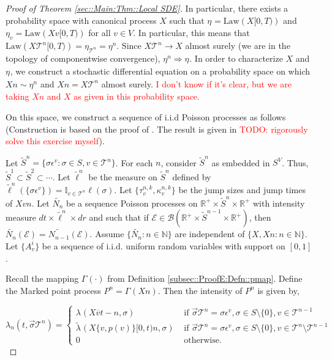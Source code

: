 \documentclass[12pt]{article}
\newcommand{\mb}{\mathbb}
\newcommand{\mc}{\mathcal}
\newcommand{\ms}{\mathscr}
\newcommand{\ra}{\rightarrow}
\newcommand{\ov}{\overline}
\newcommand{\te}{\text}
\newcommand{\ep}{\epsilon}
\newcommand{\tr}{\textcolor{red}}
\newcommand{\ind}{\hspace{24pt}}
\renewcommand{\v}{v}							%
\renewcommand{\S}{S}							%
\newcommand{\s}{\sigma}							%
\newcommand{\sv}{\vec{\s}}						%
\newcommand{\ev}[1]{\ep^{#1}}					%
\newcommand{\T}{T}								%
\renewcommand{\t}{t}							%
\newcommand{\X}{X}								%
\newcommand{\cl}{\ov}							%
\newcommand{\poiss}[1]{N_{#1}}						%
\newcommand{\law}{\te{Law}}							%
\newcommand{\pup}[1]{^{#1}}							%
\newcommand{\tree}{\mc{T}}							%
\newcommand{\V}{V}									%
\renewcommand{\r}{r}								%
\newcommand{\rt}[1]{\tau^{#1}}						%
\renewcommand{\it}{k}								%
\newcommand{\itt}{i}								%
\newcommand{\numb}{n}								%
\newcommand{\XState}[1]{\S^{#1}}				%
\newcommand{\rp}[1]{P^{#1}}							%
\newcommand{\mmm}[3]{\eta_{#2#1}^{#3}}						%
\newcommand{\rate}[1]{\lambda_{#1}}					%
\newcommand{\crate}[2]{\alt{\lambda}_{#1}^{#2}}		%
\newcommand{\Sm}{\ell}								%
\newcommand{\alt}{\widetilde}						%
\newcommand{\rv}{A}								%
\newcommand{\evnt}{\mc{E}}						%
\renewcommand{\mark}[1]{\kappa^{#1}}				%
\newcommand{\p}[1]{p(#1)}						%
\newcommand{\pmap}[1]{\Gamma_{#1}}				%
\begin{document}
\begin{proof}[Proof of Theorem \ref{sec::Main:Thm::Local SDE}]
\ind In particular, there exists a probability space with canonical process \(\X{}{}\) such that \(\mmm{}{}{} = \law(\X{}{[0,\T)})\) and \(\mmm{\v}{}{} = \law(\X{\v}{[0,\T)})\) for all \(\v \in \V\). In particular, this means that \(\law(\X{\tree\pup{\numb}}{[0,\T)}) = \mmm{\tree\pup{\numb}}{}{} = \mmm{}{}{\numb}\). Since \(\X{\tree\pup{\numb}}{} \ra \X{}{}\) almost surely (we are in the topology of componentwise convergence), \(\mmm{}{}{\numb} \Rightarrow \mmm{}{}{}\). In order to characterize \(\X{}{}\) and \(\mmm{}{}{}\), we construct a stochastic differential equation on a probability space on which \(\X{}{}{\numb} \sim \mmm{}{}{\numb}\) and \(\X{}{}{\numb} = \X{\tree\pup{\numb}}{}\) almost surely. \tr{I don't know if it's clear, but we are taking \(\X{}{}{\numb}\) and \(\X{}{}\) as given in this probability space.}

\ind On this space, we construct a sequence of i.i.d Poisson processes as follows (Construction is based on the proof of \cite[Theorem 14.7.1(b)]{DalVer08}. The result is given in \cite[Exercise 14.7.1]{DalVer08} \tr{TODO: rigorously solve this exercise myself}).

\ind Let \(\alt{\S}^\numb = \{\s\ev{\v}: \s\in\S,\v \in \tree\pup{\numb}\}\). For each \(\numb\), consider \(\alt{\S}^\numb\) as embedded in \(\S^\V\). Thus, \(\alt{\S}^1 \subset \alt{\S}^2 \subset \cdots\). Let \(\alt{\Sm}\pup{\numb}\) be the measure on \(\alt{\S}^\numb\) defined by \(\alt{\Sm}\pup{\numb}(\{\s\ev{\v}\}) = \mb{I}_{\v \in \tree\pup{\numb}}\Sm(\s)\). Let \(\{\rt{\numb,\it}_\v,\mark{\numb,\it}_{\v}\}\) be the jump sizes and jump times of \(\X{\v}{}{\numb}\). Let \(\alt{\poiss{\numb}}\) be a sequence Poisson processes on \(\mb{R}^+\times\alt{S}^\numb\times \mb{R}^+\) with intensity measure \(d\t\times\alt{\Sm}^\numb\times d\r\) and such that if \(\evnt \in \ms{B}(\mb{R}^+\times\alt{S}^{\numb-1}\times \mb{R}^+)\), then \(\alt{\poiss{\numb}}(\evnt) = \alt{\poiss{\numb-1}}(\evnt)\). Assume \(\{\alt{\poiss{\numb}}:\numb\in\mb{N}\}\) are independent of \(\{\X{}{},\X{}{}{\numb}:\numb\in\mb{N}\}\). Let \(\{\rv_{\v}^{\itt}\}\) be a sequence of i.i.d. uniform random variables with support on \([0,1]\).

\ind Recall the mapping \(\pmap{}(\cdot)\) from Definition \ref{subsec::ProofE:Defn::pmap}. Define the Marked point process \(\rp{\numb} = \pmap{}(\X{}{}{\numb})\). Then the intensity of \(\rp{\numb}\) is given by,

\[\rate{\numb}(\t,\sv{\tree\pup{\numb}}) = \begin{cases}
\rate{}(\X{\cl{\v}}{\t-}{\numb},\s) &\te{ if } \sv{\tree\pup{\numb}} = \s\ev{\v},\s \in \S\setminus\{0\},\v\in\tree\pup{\numb-1}\\
\crate{}{}(\X{\{\v,\p{\v}\}}{[0,\t)}{\numb},\s) &\te{ if } \sv{\tree\pup{\numb}} = \s\ev{\v},\s\in\S\setminus\{0\},\v\in\tree\pup{\numb}\setminus\tree\pup{\numb-1}\\
0 &\te{ otherwise.}
\end{cases}\]


\end{proof}
\end{document}
